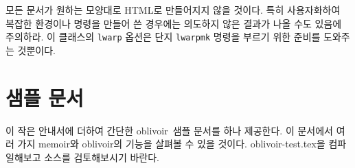 \documentclass[
	12pt,
	a4paper,
	kosection,
	footnote,
	nobookmarks,
	microtype,
	figtabcapt,
]{oblivoir}
\def\myLabel#1#2{\label{#1}}
\def\myLabel#1#2{\label{#2}}
\newcommand\obclass{ob\-liv\-oir\oblivoirallowbreak}
\begin{document}
모든 문서가 원하는 모양대로 HTML로 만들어지지 않을 것이다. 특히
사용자화하여 복잡한 환경이나 명령을 만들어 쓴 경우에는 의도하지 않은
결과가 나올 수도 있음에 주의하라. 이 클래스의 \verb|lwarp| 옵션은
단지 \verb|lwarpmk| 명령을 부르기 위한 준비를 도와주는 것뿐이다.

\section{샘플 문서}

이 작은 안내서에 더하여 간단한 \obclass\ 샘플 문서를 하나 제공한다.
이 문서에서 여러 가지 memoir와 \obclass 의 기능을 살펴볼 수 있을 것이다.
oblivoir-test.tex을 컴파일해보고 소스를 검토해보시기 바란다.

%
%
%
\end{document}
